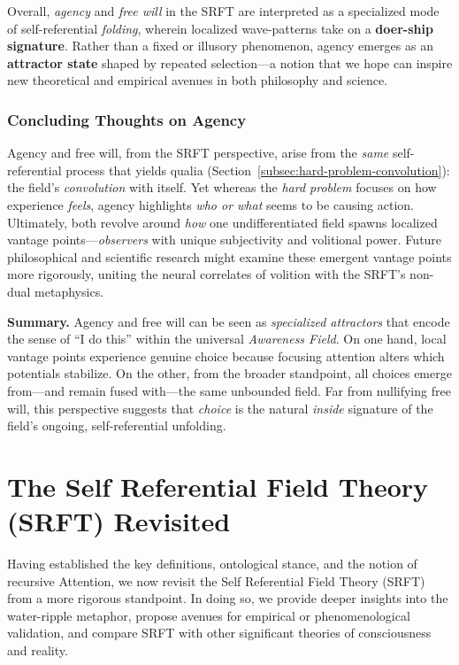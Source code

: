 \documentclass[12pt,a4paper]{article}
\begin{document}
\noindent
Overall, \emph{agency} and \emph{free will} in the SRFT are interpreted as a
specialized mode of self-referential \emph{folding}, wherein localized wave-patterns
take on a \textbf{doer-ship signature}. Rather than a fixed or illusory phenomenon,
agency emerges as an \textbf{attractor state} shaped by repeated selection—a notion
that we hope can inspire new theoretical and empirical avenues in both philosophy
and science.

\subsubsection{Concluding Thoughts on Agency}
\label{subsubsec:agency-conclusions}

Agency and free will, from the SRFT perspective, arise from the \emph{same}
self-referential process that yields qualia (Section~\ref{subsec:hard-problem-convolution}):
the field’s \emph{convolution} with itself. Yet whereas the \emph{hard problem}
focuses on how experience \emph{feels}, agency highlights \emph{who or what}
seems to be causing action. Ultimately, both revolve around \emph{how} one
undifferentiated field spawns localized vantage points—\emph{observers} with
unique subjectivity and volitional power. Future philosophical and scientific
research might examine these emergent vantage points more rigorously, uniting
the neural correlates of volition with the SRFT’s non-dual metaphysics.

\medskip
\noindent
\textbf{Summary.}  
Agency and free will can be seen as \emph{specialized attractors} that encode
the sense of “I do this” within the universal \emph{Awareness Field}. On one
hand, local vantage points experience genuine choice because focusing attention
alters which potentials stabilize. On the other, from the broader standpoint,
all choices emerge from—and remain fused with—the same unbounded field. Far
from nullifying free will, this perspective suggests that \emph{choice} is the
natural \emph{inside} signature of the field’s ongoing, self-referential
unfolding.


\section{The Self Referential Field Theory (SRFT) Revisited}
\label{sec:SRFT-detailed}

Having established the key definitions, ontological stance, and the notion of recursive Attention, we now revisit the Self Referential Field Theory (SRFT) from a more rigorous standpoint. In doing so, we provide deeper insights into the water-ripple metaphor, propose avenues for empirical or phenomenological validation, and compare SRFT with other significant theories of consciousness and reality.
\end{document}
